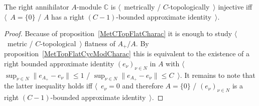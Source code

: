\begin{proposition}\label{MetTopInjModCCharac} The right annihilator $A$-module
$\mathbb{C}$ is $\langle$~metrically / $C$-topologically~$\rangle$ injective iff
$\langle$~$A= \{0 \}$ / $A$ has a right $(C-1)$-bounded approximate
identity~$\rangle$.
\end{proposition}
\begin{proof} Because of proposition~\ref{MetCTopFlatCharac} it is enough 
to study $\langle$~metric / $C$-topological~$\rangle$ flatness of $A_+/A$. By
proposition~\ref{MetTopFlatCycModCharac} this is equivalent to the existence of a 
right bounded approximate identity ${(e_\nu)}_{\nu\in N}$ in $A$ with
$\langle$~$\sup_{\nu\in N}\lVert e_{A_+}-e_\nu\rVert\leq 1$ / 
$\sup_{\nu\in N}\lVert e_{A_+}-e_\nu\rVert\leq C$~$\rangle$. 
It remains to note that the latter inequality holds 
iff $\langle$~$e_\nu=0$ and therefore $A= \{0 \}$ /
${(e_\nu)}_{\nu\in N}$ is a right $(C-1)$-bounded approximate identity~$\rangle$.
\end{proof}

